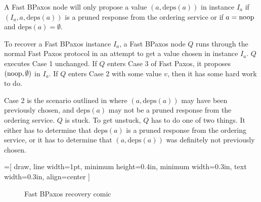 \documentclass{mwhittaker}
\theoremstyle{definition}
\newcommand{\deps}[1]{\text{deps}(#1)}
\newcommand{\invlabel}[1]{\label{invariant:#1}}
\begin{document}
\begin{boxedinvariant}\invlabel{PrunedDependencies}
  A Fast BPaxos node will only propose a value $(a, \deps{a})$ in instance
  $I_a$ if $(I_a, a, \deps{a})$ is a pruned response from the ordering service
  or if $a = \text{noop}$ and $\deps{a} = \emptyset$.
\end{boxedinvariant}

To recover a Fast BPaxos instance $I_a$, a Fast BPaxos node $Q$ runs through
the normal Fast Paxos protocol in an attempt to get a value chosen in instance
$I_a$. $Q$ executes Case 1 unchanged. If $Q$ enters Case 3 of Fast Paxos, it
proposes $(\text{noop}, \emptyset)$ in $I_a$. If $Q$ enters Case 2 with some value
$v$, then it has some hard work to do.

Case 2 is the scenario outlined in  where $(a, \deps{a})$
may have been previously chosen, and $\deps{a}$ may not be a pruned response
from the ordering service. $Q$ is stuck. To get unstuck, $Q$ has to do one of
two things. It either has to determine that $\deps{a}$ is a pruned response
from the ordering service, or it has to determine that $(a, \deps{a})$ was
definitely not previously chosen.

=[%
  draw,
  line width=1pt,
  minimum height=0.4in,
  minimum width=0.3in,
  text width=0.3in,
  align=center
]
\begin{figure}[ht]
  \centering
  \caption{Fast BPaxos recovery comic}
\end{figure}
\end{document}
